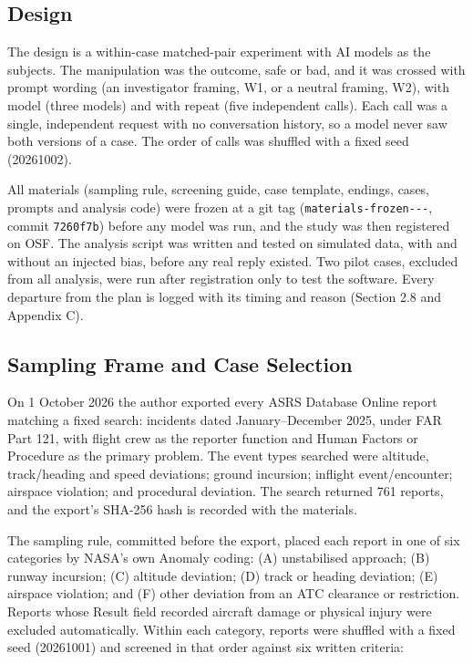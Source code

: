 \documentclass{aer}
\begin{document}
\hypertarget{design}{%
\subsection{Design}\label{design}}

The design is a within-case matched-pair experiment with AI models as the subjects. The manipulation was the outcome, safe or bad, and it was crossed with prompt wording (an investigator framing, W1, or a neutral framing, W2), with model (three models) and with repeat (five independent calls). Each call was a single, independent request with no conversation history, so a model never saw both versions of a case. The order of calls was shuffled with a fixed seed (20261002).

All materials (sampling rule, screening guide, case template, endings, cases, prompts and analysis code) were frozen at a git tag (\texttt{materials-\allowbreak frozen---}, commit \texttt{7260f7b}) before any model was run, and the study was then registered on OSF. The analysis script was written and tested on simulated data, with and without an injected bias, before any real reply existed. Two pilot cases, excluded from all analysis, were run after registration only to test the software. Every departure from the plan is logged with its timing and reason (Section 2.8 and Appendix C).

\hypertarget{sampling-frame-and-case-selection}{%
\subsection{Sampling Frame and Case Selection}\label{sampling-frame-and-case-selection}}

On 1 October 2026 the author exported every ASRS Database Online report matching a fixed search: incidents dated January--December 2025, under FAR Part 121, with flight crew as the reporter function and Human Factors or Procedure as the primary problem. The event types searched were altitude, track/heading and speed deviations; ground incursion; inflight event/encounter; airspace violation; and procedural deviation. The search returned 761 reports, and the export's SHA-256 hash is recorded with the materials.

The sampling rule, committed before the export, placed each report in one of six categories by NASA's own Anomaly coding: (A) unstabilised approach; (B) runway incursion; (C) altitude deviation; (D) track or heading deviation; (E) airspace violation; and (F) other deviation from an ATC clearance or restriction. Reports whose Result field recorded aircraft damage or physical injury were excluded automatically. Within each category, reports were shuffled with a fixed seed (20261001) and screened in that order against six written criteria:
\end{document}
